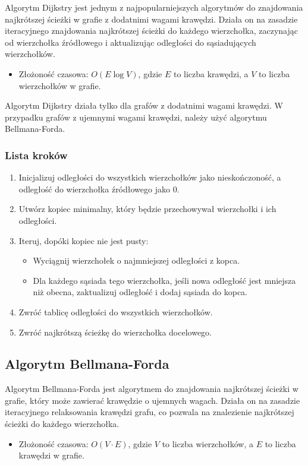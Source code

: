 \documentclass{article}
\begin{document}
Algorytm Dijkstry jest jednym z najpopularniejszych algorytmów do znajdowania najkrótszej ścieżki w grafie z dodatnimi wagami krawędzi.
Działa on na zasadzie iteracyjnego znajdowania najkrótszej ścieżki do każdego wierzchołka, zaczynając od wierzchołka źródłowego i aktualizując odległości do sąsiadujących wierzchołków.
\begin{itemize}
    \item Złożoność czasowa: $O(E \log V)$, gdzie $E$ to liczba krawędzi, a $V$ to liczba wierzchołków w grafie.
\end{itemize}

Algorytm Dijkstry działa tylko dla grafów z dodatnimi wagami krawędzi. 
W przypadku grafów z ujemnymi wagami krawędzi, należy użyć algorytmu Bellmana-Forda.

\subsubsection{Lista kroków}
\begin{enumerate}
    \item Inicjalizuj odległości do wszystkich wierzchołków jako nieskończoność, a odległość do wierzchołka źródłowego jako 0.
    \item Utwórz kopiec minimalny, który będzie przechowywał wierzchołki i ich odległości.
    \item Iteruj, dopóki kopiec nie jest pusty:
    \begin{itemize}
        \item Wyciągnij wierzchołek o najmniejszej odległości z kopca.
        \item Dla każdego sąsiada tego wierzchołka, jeśli nowa odległość jest mniejsza niż obecna, zaktualizuj odległość i dodaj sąsiada do kopca.
    \end{itemize}
    \item Zwróć tablicę odległości do wszystkich wierzchołków.
    \item Zwróć najkrótszą ścieżkę do wierzchołka docelowego.
\end{enumerate}

\subsection{Algorytm Bellmana-Forda}

Algorytm Bellmana-Forda jest algorytmem do znajdowania najkrótszej ścieżki w grafie, który może zawierać krawędzie o ujemnych wagach.
Działa on na zasadzie iteracyjnego relaksowania krawędzi grafu, co pozwala na znalezienie najkrótszej ścieżki do każdego wierzchołka.
\begin{itemize}
    \item Złożoność czasowa: $O(V \cdot E)$, gdzie $V$ to liczba wierzchołków, a $E$ to liczba krawędzi w grafie.
\end{itemize}
\end{document}
